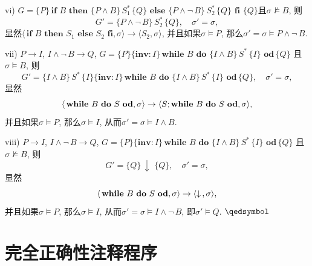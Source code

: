 \documentclass[UTF8]{ctexart}
\begin{document}
\vspace{1pt}
\hspace{0.5em} vi) $G=\{P\}\,\mathbf{if}\,\,B\,\,\mathbf{then}\,\,
\{P\land B\}\,S_1^*\,\{Q\}\,\,\mathbf{else}\,\,\{P\land\neg\,B\}\,S_2^*
\,\{Q\}\,\,\mathbf{fi}\,\,\{Q\}$且$\sigma\not\models B$, 则
\[
    G'=\{P\land\neg\,B\}\,S_2^*\,\{Q\},\quad\sigma'=\sigma,
\]
显然$\langle\,\mathbf{if}\,\,B\,\,\mathbf{then}\,\,S_1\,\,\mathbf{else}\,\,
S_2\,\,\mathbf{fi},\sigma\rangle\to\langle S_2,\sigma\rangle$,
并且如果$\sigma\models P$, 那么$\sigma'=\sigma\models P\land\neg\,B$.

\vspace{1pt}
\hspace{0.5em} vii) $P\to I$, $I\land\neg\,B\to Q$,
$G=\{P\}\{\mathbf{inv}:I\}\,\mathbf{while}\,\,B\,\,
\mathbf{do}\,\,\{I\land B\}\,S^*\,\{I\}\,\,\mathbf{od}\,\{Q\}$
且$\sigma\models B$, 则
\[
    G'=\{I\land B\}\,S^*\,\{I\}\{\mathbf{inv}:I\}\,
    \mathbf{while}\,\,B\,\,\mathbf{do}\,\,
    \{I\land B\}\,S^*\,\{I\}\,\,\mathbf{od}\,\{Q\},\quad
    \sigma'=\sigma,
\]
显然
\vspace{-5pt}
\[
    \langle\,\mathbf{while}\,\,B\,\,\mathbf{do}\,\,S\,\,\mathbf{od},
    \sigma\rangle\to
    \langle S;\mathbf{while}\,\,B\,\,\mathbf{do}\,\,S\,\,\mathbf{od},
    \sigma\rangle,\\[-5pt]
\]
并且如果$\sigma\models P$, 那么$\sigma\models I$,
从而$\sigma'=\sigma\models I\land B$.

\vspace{1pt}
\hspace{0.5em} viii) $P\to I$, $I\land\neg\,B\to Q$,
$G=\{P\}\{\mathbf{inv}:I\}\,\mathbf{while}\,\,B\,\,
\mathbf{do}\,\,\{I\land B\}\,S^*\,\{I\}\,\,\mathbf{od}\,\{Q\}$
且$\sigma\not\models B$, 则
\[
    G'=\{Q\}\,\downarrow\,\,\{Q\},\quad\sigma'=\sigma,
\]
显然
\vspace{-5pt}
\[
    \langle\,\mathbf{while}\,\,B\,\,\mathbf{do}\,\,S\,\,\mathbf{od},
    \sigma\rangle\to
    \langle\downarrow\,,\sigma\rangle,\\[-5pt]
\]
并且如果$\sigma\models P$, 那么$\sigma\models I$,
从而$\sigma'=\sigma\models I\land\neg\,B$, 即$\sigma'\models Q$.
\hfill $\qedsymbol$





\newpage

\section{完全正确性注释程序}
\end{document}
